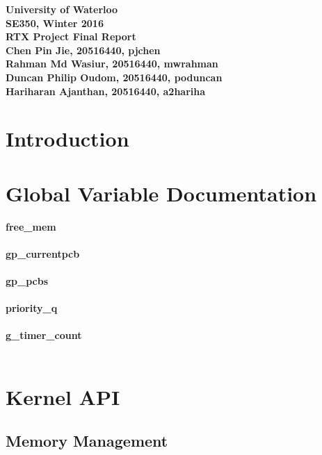 \documentclass[12pt]{article}
\begin{document}
\begin{center}
{\Large\bf University of Waterloo}\\
\vspace{3mm}
{\Large\bf SE350, Winter 2016}\\
\vspace{80mm}
{\Large\bf RTX Project Final Report}\\
\vspace{80mm}
\textbf{Chen Pin Jie, 20516440, pjchen} \\
\textbf{Rahman Md Wasiur, 20516440, mwrahman} \\
\textbf{Duncan Philip Oudom, 20516440,  poduncan} \\
\textbf{Hariharan Ajanthan, 20516440, a2hariha} \\

\end{center}

\def\question#1{\item[\bf #1.]}
\def\part#1{\item[\bf #1)]}
\newcommand{\pc}[1]{\mbox{\textbf{#1}}} %

\clearpage
\tableofcontents
\newpage
\section{Introduction}
\newpage
\section{Global Variable Documentation}
\textbf{free\_mem}\\ \\
\textbf{gp\_currentpcb}\\ \\
\textbf{gp\_pcbs}\\ \\
\textbf{priority\_q}\\ \\
\textbf{g\_timer\_count} \\ \\
\newpage
\section{Kernel API}
\subsection{Memory Management}
\end{document}
